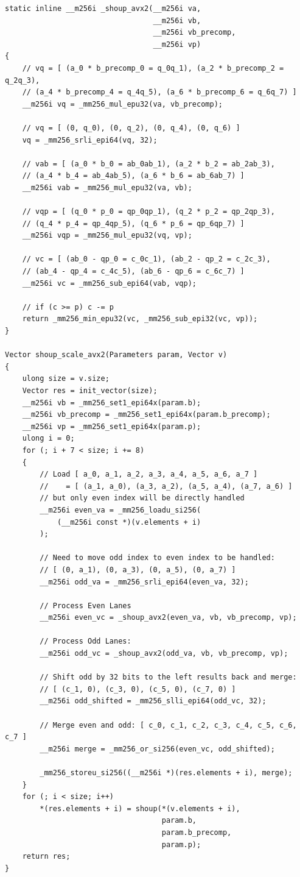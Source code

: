 \documentclass{article}
\begin{document}
\begin{lstlisting}[caption = Variant 1 (AVX2)]
static inline __m256i _shoup_avx2(__m256i va,
                                  __m256i vb,
                                  __m256i vb_precomp,
                                  __m256i vp)
{
    // vq = [ (a_0 * b_precomp_0 = q_0q_1), (a_2 * b_precomp_2 = q_2q_3),
    // (a_4 * b_precomp_4 = q_4q_5), (a_6 * b_precomp_6 = q_6q_7) ]
    __m256i vq = _mm256_mul_epu32(va, vb_precomp);

    // vq = [ (0, q_0), (0, q_2), (0, q_4), (0, q_6) ]
    vq = _mm256_srli_epi64(vq, 32);

    // vab = [ (a_0 * b_0 = ab_0ab_1), (a_2 * b_2 = ab_2ab_3),
    // (a_4 * b_4 = ab_4ab_5), (a_6 * b_6 = ab_6ab_7) ]
    __m256i vab = _mm256_mul_epu32(va, vb);

    // vqp = [ (q_0 * p_0 = qp_0qp_1), (q_2 * p_2 = qp_2qp_3),
    // (q_4 * p_4 = qp_4qp_5), (q_6 * p_6 = qp_6qp_7) ]
    __m256i vqp = _mm256_mul_epu32(vq, vp);

    // vc = [ (ab_0 - qp_0 = c_0c_1), (ab_2 - qp_2 = c_2c_3),
    // (ab_4 - qp_4 = c_4c_5), (ab_6 - qp_6 = c_6c_7) ]
    __m256i vc = _mm256_sub_epi64(vab, vqp);

    // if (c >= p) c -= p
    return _mm256_min_epu32(vc, _mm256_sub_epi32(vc, vp));
}

Vector shoup_scale_avx2(Parameters param, Vector v)
{
    ulong size = v.size;
    Vector res = init_vector(size);
    __m256i vb = _mm256_set1_epi64x(param.b);
    __m256i vb_precomp = _mm256_set1_epi64x(param.b_precomp);
    __m256i vp = _mm256_set1_epi64x(param.p);
    ulong i = 0;
    for (; i + 7 < size; i += 8)
    {
        // Load [ a_0, a_1, a_2, a_3, a_4, a_5, a_6, a_7 ]
        //    = [ (a_1, a_0), (a_3, a_2), (a_5, a_4), (a_7, a_6) ]
        // but only even index will be directly handled
        __m256i even_va = _mm256_loadu_si256(
            (__m256i const *)(v.elements + i)
        );

        // Need to move odd index to even index to be handled:
        // [ (0, a_1), (0, a_3), (0, a_5), (0, a_7) ]
        __m256i odd_va = _mm256_srli_epi64(even_va, 32);

        // Process Even Lanes
        __m256i even_vc = _shoup_avx2(even_va, vb, vb_precomp, vp);

        // Process Odd Lanes:
        __m256i odd_vc = _shoup_avx2(odd_va, vb, vb_precomp, vp);

        // Shift odd by 32 bits to the left results back and merge:
        // [ (c_1, 0), (c_3, 0), (c_5, 0), (c_7, 0) ]
        __m256i odd_shifted = _mm256_slli_epi64(odd_vc, 32);

        // Merge even and odd: [ c_0, c_1, c_2, c_3, c_4, c_5, c_6, c_7 ]
        __m256i merge = _mm256_or_si256(even_vc, odd_shifted);

        _mm256_storeu_si256((__m256i *)(res.elements + i), merge);
    }
    for (; i < size; i++)
        *(res.elements + i) = shoup(*(v.elements + i),
                                    param.b,
                                    param.b_precomp,
                                    param.p);
    return res;
}
\end{lstlisting}
\end{document}
